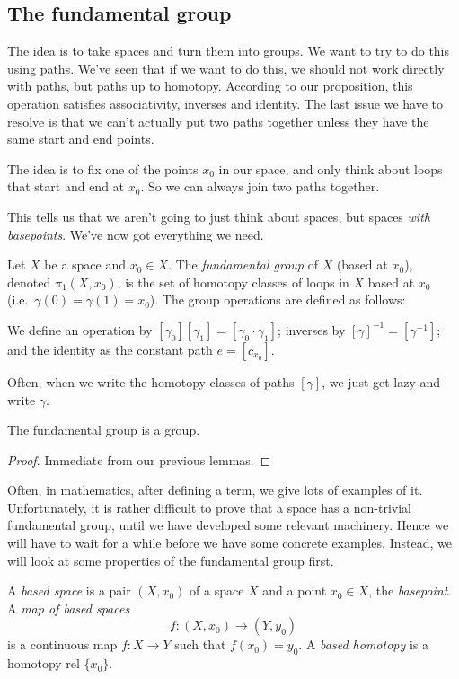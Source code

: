 \documentclass[a4paper]{article}
\begin{document}
\subsection{The fundamental group}
The idea is to take spaces and turn them into groups. We want to try to do this using paths. We've seen that if we want to do this, we should not work directly with paths, but paths up to homotopy. According to our proposition, this operation satisfies associativity, inverses and identity. The last issue we have to resolve is that we can't actually put two paths together unless they have the same start and end points.

The idea is to fix one of the points $x_0$ in our space, and only think about loops that start and end at $x_0$. So we can always join two paths together.

This tells us that we aren't going to just think about spaces, but spaces \emph{with basepoints}. We've now got everything we need.

\begin{defi}
  Let $X$ be a space and $x_0 \in X$. The \emph{fundamental group} of $X$ (based at $x_0$), denoted $\pi_1(X, x_0)$, is the set of homotopy classes of loops in $X$ based at $x_0$ (i.e.\ $\gamma(0) = \gamma(1) = x_0$). The group operations are defined as follows:

  We define an operation by $[\gamma_0][\gamma_1] = [\gamma_0\cdot \gamma_1]$; inverses by $[\gamma]^{-1} = [\gamma^{-1}]$; and the identity as the constant path $e = [c_{x_0}]$.
\end{defi}
Often, when we write the homotopy classes of paths $[\gamma]$, we just get lazy and write $\gamma$.

\begin{thm}
  The fundamental group is a group.
\end{thm}

\begin{proof}
  Immediate from our previous lemmas.
\end{proof}

Often, in mathematics, after defining a term, we give lots of examples of it. Unfortunately, it is rather difficult to prove that a space has a non-trivial fundamental group, until we have developed some relevant machinery. Hence we will have to wait for a while before we have some concrete examples. Instead, we will look at some properties of the fundamental group first.

\begin{defi}
  A \emph{based space} is a pair $(X, x_0)$ of a space $X$ and a point $x_0\in X$, the \emph{basepoint}. A \emph{map of based spaces}
  \[
    f: (X, x_0) \to (Y, y_0)
  \]
  is a continuous map $f: X\to Y$ such that $f(x_0) = y_0$. A \emph{based homotopy} is a homotopy rel $\{x_0\}$.
\end{defi}
\end{document}
